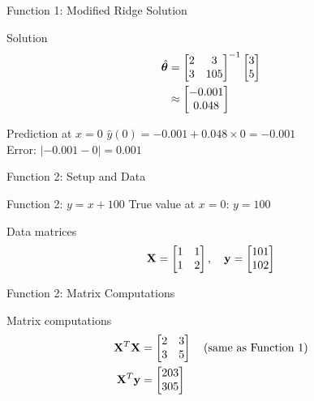 \documentclass{beamer}
\begin{document}
\begin{frame}{Function 1: Modified Ridge Solution}
\begin{codebox}{Solution}
\begin{align}
\hat{\boldsymbol{\theta}} &= \begin{bmatrix} 2 & 3 \\ 3 & 105 \end{bmatrix}^{-1} \begin{bmatrix} 3 \\ 5 \end{bmatrix} \\
&\approx \begin{bmatrix} -0.001 \\ 0.048 \end{bmatrix}
\end{align}
\end{codebox}
\pause

\begin{theorembox}{Prediction at $x=0$}
$\hat{y}(0) = -0.001 + 0.048 \times 0 = -0.001$ \\
{\small Error: $|-0.001 - 0| = 0.001$}
\end{theorembox}
\end{frame}

\begin{frame}{Function 2: Setup and Data}
\begin{theorembox}{Function 2: $y = x + 100$}
True value at $x=0$: $y = 100$
\end{theorembox}

\begin{codebox}{Data matrices}
$$\mathbf{X} = \begin{bmatrix} 1 & 1 \\ 1 & 2 \end{bmatrix}, \quad \mathbf{y} = \begin{bmatrix} 101 \\ 102 \end{bmatrix}$$
\end{codebox}
\end{frame}

\begin{frame}{Function 2: Matrix Computations}
\begin{codebox}{Matrix computations}
\begin{align}
\mathbf{X}^T\mathbf{X} &= \begin{bmatrix} 2 & 3 \\ 3 & 5 \end{bmatrix} \quad \text{(same as Function 1)} \\
\mathbf{X}^T\mathbf{y} &= \begin{bmatrix} 203 \\ 305 \end{bmatrix}
\end{align}
\end{codebox}
\end{frame}
\end{document}

